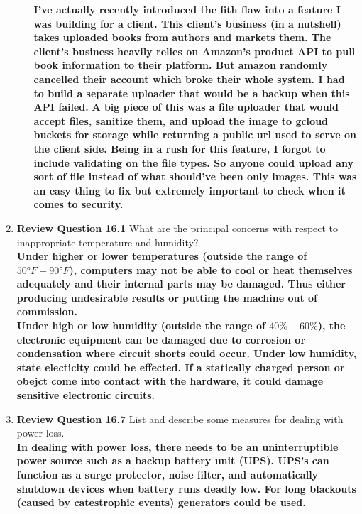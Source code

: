 \documentclass[12pt]{article}
\begin{document}
\begin{enumerate}
\begin{enumerate}
  \textbf{I've actually recently introduced the fith flaw into a feature I was building for a client. This client's business (in a nutshell) takes uploaded books from authors and markets them. The client's business heavily relies on Amazon's product API to pull book information to their platform. But amazon randomly cancelled their account which broke their whole system. I had to build a separate uploader that would be a backup when this API failed.}
  \textbf{A big piece of this was a file uploader that would accept files, sanitize them, and upload the image to gcloud buckets for storage while returning a public url used to serve on the client side. Being in a rush for this feature, I forgot to include validating on the file types. So anyone could upload any sort of file instead of what should've been only images. This was an easy thing to fix but extremely important to check when it comes to security.} \\

\end{enumerate}


  \item \textbf{Review Question 16.1} What are the principal concerns with respect to inappropriate temperature and humidity?\\

  \textbf{Under higher or lower temperatures (outside the range of $\ang{50}F - \ang{90}F$), computers may not be able to cool or heat themselves adequately  and their internal parts may be damaged. Thus either producing undesirable results or putting the machine out of commission. } \\
  \textbf{Under high or low humidity (outside the range of $40\% - 60\%$), the electronic equipment can be damaged due to corrosion or condensation where circuit shorts could occur. Under low humidity, state electicity could be effected. If a statically charged person or obejct come into contact with the hardware, it could damage sensitive electronic circuits. } \\

  \item \textbf{Review Question 16.7} List and describe some measures for dealing with power loss. \\

  \textbf{In dealing with power loss, there needs to be an uninterruptible power source such as a backup battery unit (UPS). UPS's can function as a surge protector, noise filter, and automatically shutdown devices when battery runs deadly low. For long blackouts (caused by catestrophic events) generators could be used.} \\


\end{enumerate}
\end{document}
